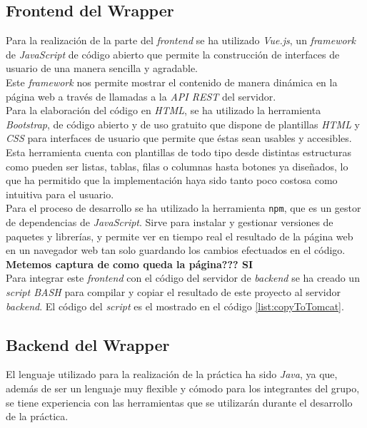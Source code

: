 \documentclass[10pt,a4paper]{article}
\begin{document}
\subsection{Frontend del Wrapper}

Para la realización de la parte del \emph{frontend} se ha utilizado \emph{Vue.js}, un \emph{framework} de \emph{JavaScript} de código abierto que permite la construcción de interfaces de usuario de una manera sencilla y agradable. \\ 
Este \emph{framework} nos permite mostrar el contenido de manera dinámica en la página web a través de llamadas a la \emph{API REST} del servidor.\\
Para la elaboración del código en \emph{HTML}, se ha utilizado la herramienta \emph{Bootstrap}, de código abierto y de uso gratuito que dispone de plantillas \emph{HTML} y \emph{CSS} para interfaces de usuario que permite que éstas sean usables y accesibles. Esta herramienta cuenta con plantillas de todo tipo desde distintas estructuras como pueden ser listas, tablas, filas o columnas hasta botones ya diseñados, lo que ha permitido que la implementación haya sido tanto poco costosa como intuitiva para el usuario.\\
Para el proceso de desarrollo se ha utilizado la herramienta \texttt{npm}, que es un gestor de dependencias de \emph{JavaScript}. Sirve para instalar y gestionar versiones de paquetes y librerías, y permite ver en tiempo real el resultado de la página web en un navegador web tan solo guardando los cambios efectuados en el código.\\

\textbf{Metemos captura de como queda la página??? {\Huge SI}}\\

Para integrar este \emph{frontend} con el código del servidor de \emph{backend} se ha creado un \emph{script BASH} para compilar y copiar el resultado de este proyecto al servidor \emph{backend}. El código del \emph{script} es el mostrado en el código \ref{list:copyToTomcat}.



\subsection{Backend del Wrapper}
El lenguaje utilizado para la realización de la práctica ha sido \textit{Java}, ya que, además de ser un lenguaje muy flexible y cómodo para los integrantes del grupo, se tiene experiencia con las herramientas que se utilizarán durante el desarrollo de la práctica.\\
\end{document}
